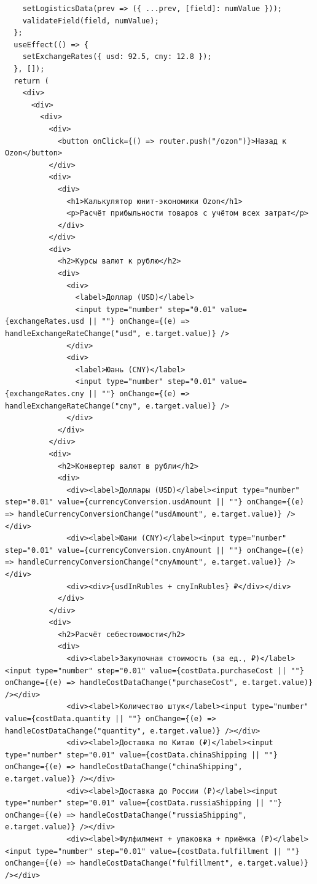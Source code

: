 \begin{code}
\begin{verbatim}
    setLogisticsData(prev => ({ ...prev, [field]: numValue }));
    validateField(field, numValue);
  };
  useEffect(() => {
    setExchangeRates({ usd: 92.5, cny: 12.8 });
  }, []);
  return (
    <div>
      <div>
        <div>
          <div>
            <button onClick={() => router.push("/ozon")}>Назад к Ozon</button>
          </div>
          <div>
            <div>
              <h1>Калькулятор юнит-экономики Ozon</h1>
              <p>Расчёт прибыльности товаров с учётом всех затрат</p>
            </div>
          </div>
          <div>
            <h2>Курсы валют к рублю</h2>
            <div>
              <div>
                <label>Доллар (USD)</label>
                <input type="number" step="0.01" value={exchangeRates.usd || ""} onChange={(e) => handleExchangeRateChange("usd", e.target.value)} />
              </div>
              <div>
                <label>Юань (CNY)</label>
                <input type="number" step="0.01" value={exchangeRates.cny || ""} onChange={(e) => handleExchangeRateChange("cny", e.target.value)} />
              </div>
            </div>
          </div>
          <div>
            <h2>Конвертер валют в рубли</h2>
            <div>
              <div><label>Доллары (USD)</label><input type="number" step="0.01" value={currencyConversion.usdAmount || ""} onChange={(e) => handleCurrencyConversionChange("usdAmount", e.target.value)} /></div>
              <div><label>Юани (CNY)</label><input type="number" step="0.01" value={currencyConversion.cnyAmount || ""} onChange={(e) => handleCurrencyConversionChange("cnyAmount", e.target.value)} /></div>
              <div><div>{usdInRubles + cnyInRubles} ₽</div></div>
            </div>
          </div>
          <div>
            <h2>Расчёт себестоимости</h2>
            <div>
              <div><label>Закупочная стоимость (за ед., ₽)</label><input type="number" step="0.01" value={costData.purchaseCost || ""} onChange={(e) => handleCostDataChange("purchaseCost", e.target.value)} /></div>
              <div><label>Количество штук</label><input type="number" value={costData.quantity || ""} onChange={(e) => handleCostDataChange("quantity", e.target.value)} /></div>
              <div><label>Доставка по Китаю (₽)</label><input type="number" step="0.01" value={costData.chinaShipping || ""} onChange={(e) => handleCostDataChange("chinaShipping", e.target.value)} /></div>
              <div><label>Доставка до России (₽)</label><input type="number" step="0.01" value={costData.russiaShipping || ""} onChange={(e) => handleCostDataChange("russiaShipping", e.target.value)} /></div>
              <div><label>Фулфилмент + упаковка + приёмка (₽)</label><input type="number" step="0.01" value={costData.fulfillment || ""} onChange={(e) => handleCostDataChange("fulfillment", e.target.value)} /></div>

\end{verbatim}
\end{code}
